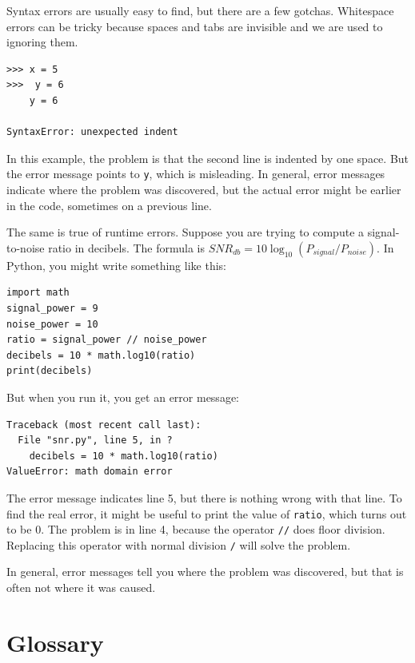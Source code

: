 \documentclass[10pt]{book}
\begin{document}
Syntax errors are usually easy to find, but there are a few
gotchas.  Whitespace errors can be tricky because spaces and
tabs are invisible and we are used to ignoring them.


\beforeverb
\begin{verbatim}
>>> x = 5
>>>  y = 6
    y = 6
 
SyntaxError: unexpected indent
\end{verbatim}
\afterverb
%
In this example, the problem is that the second line is indented by
one space.  But the error message points to {\tt y}, which is
misleading.  In general, error messages indicate where the problem was
discovered, but the actual error might be earlier in the code,
sometimes on a previous line.


The same is true of runtime errors.  Suppose you are trying
to compute a signal-to-noise ratio in decibels.  The formula
is $SNR_{db} = 10 \log_{10} (P_{signal} / P_{noise})$.  In Python,
you might write something like this:

\beforeverb
\begin{verbatim}
import math
signal_power = 9
noise_power = 10
ratio = signal_power // noise_power
decibels = 10 * math.log10(ratio)
print(decibels)
\end{verbatim}
\afterverb
%
But when you run it, you get an error message:


\beforeverb
\begin{verbatim}
Traceback (most recent call last):
  File "snr.py", line 5, in ?
    decibels = 10 * math.log10(ratio)
ValueError: math domain error
\end{verbatim}
\afterverb
%
The error message indicates line 5, but there is nothing
wrong with that line.  To find the real error, it might be
useful to print the value of {\tt ratio}, which turns out to
be 0.  The problem is in line 4, because the operator {\tt //}
does floor division.  Replacing this operator with normal division {\tt /}
will solve the problem.


In general, error messages tell you where the problem was discovered, 
but that is often not where it was caused.


\section{Glossary}
\end{document}
